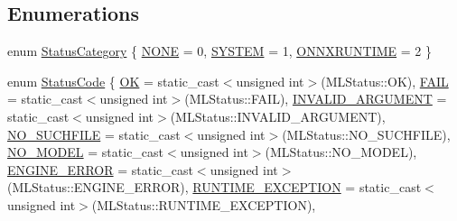 \subsection*{Enumerations}
\begin{DoxyCompactItemize}
\item 
enum \mbox{\hyperlink{namespaceonnxruntime_1_1common_afab40a94a5b6b651a1c24921d4e5c4d5}{Status\+Category}} \{ \mbox{\hyperlink{namespaceonnxruntime_1_1common_afab40a94a5b6b651a1c24921d4e5c4d5a179f5946c56d4adf760171c2ed41d840}{N\+O\+NE}} = 0, 
\mbox{\hyperlink{namespaceonnxruntime_1_1common_afab40a94a5b6b651a1c24921d4e5c4d5ac06d8e95b2651b308d2651f8b015c33c}{S\+Y\+S\+T\+EM}} = 1, 
\mbox{\hyperlink{namespaceonnxruntime_1_1common_afab40a94a5b6b651a1c24921d4e5c4d5a553a760b1723d320685acd762bfd7372}{O\+N\+N\+X\+R\+U\+N\+T\+I\+ME}} = 2
 \}
\item 
enum \mbox{\hyperlink{namespaceonnxruntime_1_1common_a9dd72ac7df927aa93801eceb7e06fd2b}{Status\+Code}} \{ \newline
\mbox{\hyperlink{namespaceonnxruntime_1_1common_a9dd72ac7df927aa93801eceb7e06fd2baaae015c2d386f5181df610537a83ba8e}{OK}} = static\+\_\+cast$<$unsigned int$>$(M\+L\+Status\+:\+:OK), 
\mbox{\hyperlink{namespaceonnxruntime_1_1common_a9dd72ac7df927aa93801eceb7e06fd2ba8c06735b7a9475ff93c7bc2e41e62f93}{F\+A\+IL}} = static\+\_\+cast$<$unsigned int$>$(M\+L\+Status\+:\+:F\+A\+IL), 
\mbox{\hyperlink{namespaceonnxruntime_1_1common_a9dd72ac7df927aa93801eceb7e06fd2baec184a24eab4bb684bef28cc8da22201}{I\+N\+V\+A\+L\+I\+D\+\_\+\+A\+R\+G\+U\+M\+E\+NT}} = static\+\_\+cast$<$unsigned int$>$(M\+L\+Status\+:\+:I\+N\+V\+A\+L\+I\+D\+\_\+\+A\+R\+G\+U\+M\+E\+NT), 
\mbox{\hyperlink{namespaceonnxruntime_1_1common_a9dd72ac7df927aa93801eceb7e06fd2bab645e761fdc0c0855fb85f61dcf6976f}{N\+O\+\_\+\+S\+U\+C\+H\+F\+I\+LE}} = static\+\_\+cast$<$unsigned int$>$(M\+L\+Status\+:\+:N\+O\+\_\+\+S\+U\+C\+H\+F\+I\+LE), 
\newline
\mbox{\hyperlink{namespaceonnxruntime_1_1common_a9dd72ac7df927aa93801eceb7e06fd2bacf7d62164020462883a9dc15007708e4}{N\+O\+\_\+\+M\+O\+D\+EL}} = static\+\_\+cast$<$unsigned int$>$(M\+L\+Status\+:\+:N\+O\+\_\+\+M\+O\+D\+EL), 
\mbox{\hyperlink{namespaceonnxruntime_1_1common_a9dd72ac7df927aa93801eceb7e06fd2bad59aa2f945cfdbdfbbfb84f3fcaaf10c}{E\+N\+G\+I\+N\+E\+\_\+\+E\+R\+R\+OR}} = static\+\_\+cast$<$unsigned int$>$(M\+L\+Status\+:\+:E\+N\+G\+I\+N\+E\+\_\+\+E\+R\+R\+OR), 
\mbox{\hyperlink{namespaceonnxruntime_1_1common_a9dd72ac7df927aa93801eceb7e06fd2ba70ab5e827b7fecf587452ca2b5665a6d}{R\+U\+N\+T\+I\+M\+E\+\_\+\+E\+X\+C\+E\+P\+T\+I\+ON}} = static\+\_\+cast$<$unsigned int$>$(M\+L\+Status\+:\+:R\+U\+N\+T\+I\+M\+E\+\_\+\+E\+X\+C\+E\+P\+T\+I\+ON), 

\end{DoxyCompactItemize}
